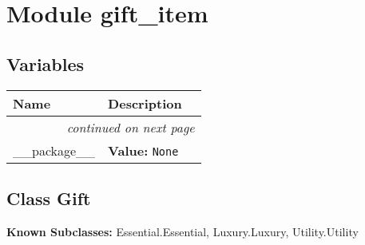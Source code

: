 %
%
%


\section{Module gift\_item}

    \label{gift_item}


  \subsection{Variables}

    \vspace{-1cm}
\hspace{\varindent}\begin{longtable}{|p{\varnamewidth}|p{\vardescrwidth}|l}
\cline{1-2}
\cline{1-2} \centering \textbf{Name} & \centering \textbf{Description}& \\
\cline{1-2}
\endhead\cline{1-2}\multicolumn{3}{r}{\small\textit{continued on next page}}\\\endfoot\cline{1-2}
\endlastfoot\raggedright \_\-\_\-p\-a\-c\-k\-a\-g\-e\-\_\-\_\- & \raggedright \textbf{Value:} 
{\tt None}&\\
\cline{1-2}
\end{longtable}



\subsection{Class Gift}

    \label{gift_item:Gift}
\textbf{Known Subclasses:}
Essential.Essential,
    Luxury.Luxury,
    Utility.Utility


